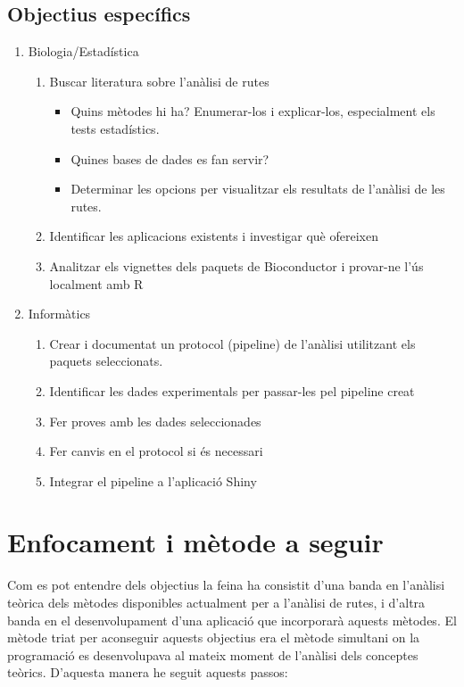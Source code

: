 \subsection{Objectius específics}
\begin{enumerate}
\item Biologia/Estadística
\begin{enumerate}
\item Buscar literatura sobre l'anàlisi de rutes
\begin{itemize}
\item Quins mètodes hi ha? Enumerar-los i explicar-los, especialment els tests estadístics.
\item Quines bases de dades es fan servir?
\item Determinar les opcions per visualitzar els resultats de l'anàlisi de les rutes.
\end{itemize}
\item Identificar les aplicacions existents i investigar què ofereixen
\item Analitzar els vignettes dels paquets de \gls{Bioconductor} i provar-ne l’ús localment amb R
\end{enumerate}
\item Informàtics
\begin{enumerate}
\item Crear i documentat un protocol (pipeline) de l'anàlisi utilitzant els paquets seleccionats. 
\item Identificar les dades experimentals per passar-les pel pipeline creat
\item Fer proves amb les dades seleccionades
\item Fer canvis en el protocol si és necessari
\item Integrar el pipeline a l'aplicació Shiny
\end{enumerate}
\end{enumerate}

\section{Enfocament i mètode a seguir}

Com es pot entendre dels objectius la feina ha consistit d'una banda en l'anàlisi teòrica dels mètodes disponibles actualment per a l'anàlisi de rutes, i d'altra banda en el desenvolupament d'una aplicació que incorporarà aquests mètodes. El mètode triat per aconseguir aquests objectius era el mètode simultani on la programació es desenvolupava al mateix moment de l'anàlisi dels conceptes teòrics. D'aquesta manera he seguit aquests passos:


